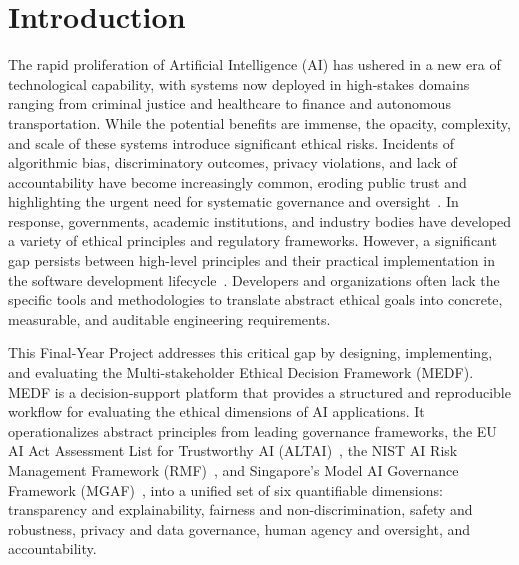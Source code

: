 \chapter{Introduction}
\label{ch:introduction}

The rapid proliferation of Artificial Intelligence (AI) has ushered in a new era of technological capability, with systems now deployed in high-stakes domains ranging from criminal justice and healthcare to finance and autonomous transportation. While the potential benefits are immense, the opacity, complexity, and scale of these systems introduce significant ethical risks. Incidents of algorithmic bias, discriminatory outcomes, privacy violations, and lack of accountability have become increasingly common, eroding public trust and highlighting the urgent need for systematic governance and oversight~\cite{zhang2023fairness,jobin2019landscape}. In response, governments, academic institutions, and industry bodies have developed a variety of ethical principles and regulatory frameworks. However, a significant gap persists between high-level principles and their practical implementation in the software development lifecycle~\cite{mittelstadt2019principles}. Developers and organizations often lack the specific tools and methodologies to translate abstract ethical goals into concrete, measurable, and auditable engineering requirements.

This Final-Year Project addresses this critical gap by designing, implementing, and evaluating the Multi-stakeholder Ethical Decision Framework (MEDF). MEDF is a decision-support platform that provides a structured and reproducible workflow for evaluating the ethical dimensions of AI applications. It operationalizes abstract principles from leading governance frameworks, the EU AI Act Assessment List for Trustworthy AI (ALTAI)~\cite{aihleg2020altai}, the NIST AI Risk Management Framework (RMF)~\cite{nist2023rmf}, and Singapore's Model AI Governance Framework (MGAF)~\cite{pdpc2020mgaf}, into a unified set of six quantifiable dimensions: transparency and explainability, fairness and non-discrimination, safety and robustness, privacy and data governance, human agency and oversight, and accountability.

